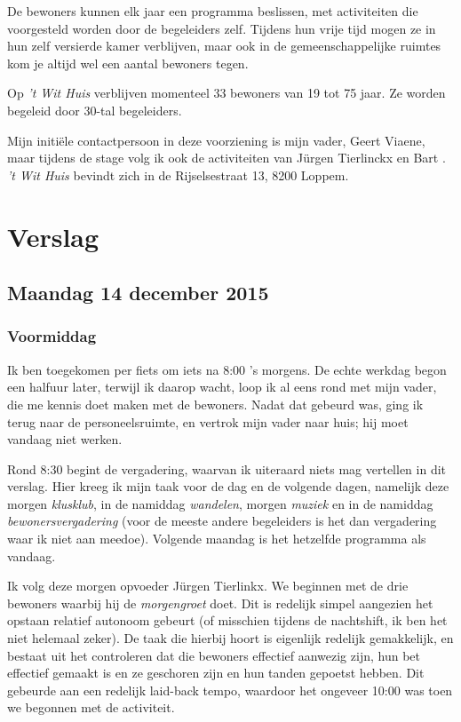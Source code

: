 \documentclass[a4paper,12pt]{article}
\begin{document}
De bewoners kunnen elk jaar een programma beslissen, met activiteiten die voorgesteld worden door de begeleiders zelf. Tijdens hun vrije tijd mogen ze in hun zelf versierde kamer verblijven, maar ook in de gemeenschappelijke ruimtes kom je altijd wel een aantal bewoners tegen.

Op \emph{'t Wit Huis} verblijven momenteel 33 bewoners van 19 tot 75 jaar. Ze worden begeleid door 30-tal begeleiders.

Mijn initiële contactpersoon in deze voorziening is mijn vader, Geert Viaene, maar tijdens de stage volg ik ook de activiteiten van Jürgen Tierlinckx en Bart%
. \emph{'t Wit Huis} bevindt zich in de Rijselsestraat 13, 8200 Loppem.

\section{Verslag}


\subsection{Maandag 14 december 2015}

\subsubsection{Voormiddag}

Ik ben toegekomen per fiets om iets na 8:00 's morgens. De echte werkdag begon een halfuur later, terwijl ik daarop wacht, loop ik al eens rond met mijn vader, die me kennis doet maken met de bewoners. Nadat dat gebeurd was, ging ik terug naar de personeelsruimte, en vertrok mijn vader naar huis; hij moet vandaag niet werken.

Rond 8:30 begint de vergadering, waarvan ik uiteraard niets mag vertellen in dit verslag. Hier kreeg ik mijn taak voor de dag en de volgende dagen, namelijk deze morgen \emph{klusklub}, in de namiddag \emph{wandelen}, morgen \emph{muziek} en in de namiddag \emph{bewonersvergadering} (voor de meeste andere begeleiders is het dan vergadering waar ik niet aan meedoe). Volgende maandag is het hetzelfde programma als vandaag.

Ik volg deze morgen opvoeder Jürgen Tierlinkx. We beginnen met de drie bewoners waarbij hij de \emph{morgengroet} doet. Dit is redelijk simpel aangezien het opstaan relatief autonoom gebeurt (of misschien tijdens de nachtshift, ik ben het niet helemaal zeker). De taak die hierbij hoort is eigenlijk redelijk gemakkelijk, en bestaat uit het controleren dat die bewoners effectief aanwezig zijn, hun bet effectief gemaakt is en ze geschoren zijn en hun tanden gepoetst hebben. Dit gebeurde aan een redelijk laid-back tempo, waardoor het ongeveer 10:00 was toen we begonnen met de activiteit.
\end{document}
